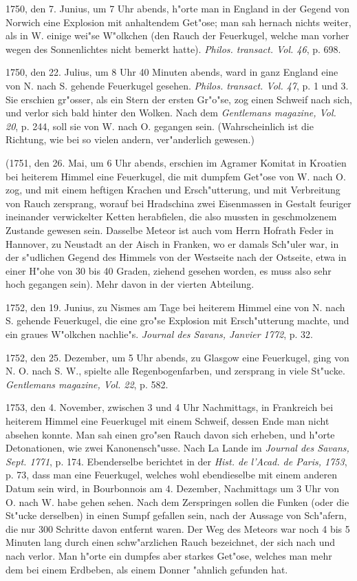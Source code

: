 \documentclass[a4paper, 11pt, oneside, polutonikogreek, german]{article}
\begin{document}
1750, den 7. Junius, um 7 Uhr abends, h"orte man in England in der Gegend von Norwich eine Explosion mit anhaltendem Get"ose; man sah hernach nichts weiter, als in W. einige wei"se W"olkchen (den Rauch der Feuerkugel, welche man vorher wegen des Sonnenlichtes nicht bemerkt hatte). \emph{Philos. transact. Vol. 46}, p. 698.

1750, den 22. Julius, um 8 Uhr 40 Minuten abends, ward in ganz England eine von N. nach S. gehende Feuerkugel gesehen. \emph{Philos. transact. Vol. 47}, p. 1 und 3. Sie erschien gr"osser, als ein Stern der ersten Gr"o"se, zog einen Schweif nach sich, und verlor sich bald hinter den Wolken. Nach dem \emph{Gentlemans magazine, Vol. 20}, p. 244, soll sie von W. nach O. gegangen sein. (Wahrscheinlich ist die Richtung, wie bei so vielen andern, ver"anderlich gewesen.)

(1751, den 26. Mai, um 6 Uhr abends, erschien im Agramer Komitat in Kroatien bei heiterem Himmel eine Feuerkugel, die mit dumpfem Get"ose von W. nach O. zog, und mit einem heftigen Krachen und Ersch"utterung, und mit Verbreitung von Rauch zersprang, worauf bei Hradschina zwei Eisenmassen in Gestalt feuriger ineinander verwickelter Ketten herabfielen, die also mussten in geschmolzenem Zustande gewesen sein. Dasselbe Meteor ist auch vom Herrn Hofrath Feder in Hannover, zu Neustadt an der Aisch in Franken, wo er damals Sch"uler war, in der s"udlichen Gegend des Himmels von der Westseite nach der Ostseite, etwa in einer H"ohe von 30 bis 40 Graden, ziehend gesehen worden, es muss also sehr hoch gegangen sein). Mehr davon in der vierten Abteilung.

1752, den 19. Junius, zu Nismes am Tage bei heiterem Himmel eine von N. nach S. gehende Feuerkugel, die eine gro"se Explosion mit Ersch"utterung machte, und ein graues W"olkchen nachlie"s. \emph{Journal des Savans, Janvier 1772}, p. 32.

1752, den 25. Dezember, um 5 Uhr abends, zu Glasgow eine Feuerkugel, ging von N. O. nach S. W., spielte alle Regenbogenfarben, und zersprang in viele St"ucke. \emph{Gentlemans magazine, Vol. 22}, p. 582.

1753, den 4. November, zwischen 3 und 4 Uhr Nachmittags, in Frankreich bei heiterem Himmel eine Feuerkugel mit einem Schweif, dessen Ende man nicht absehen konnte. Man sah einen gro"sen Rauch davon sich erheben, und h"orte Detonationen, wie zwei Kanonensch"usse. Nach La Lande im \emph{Journal des Savans, Sept. 1771}, p. 174. Ebenderselbe berichtet in der \emph{Hist. de l'Acad. de Paris, 1753}, p. 73, dass man eine Feuerkugel, welches wohl ebendieselbe mit einem anderen Datum sein wird, in Bourbonnois am 4. Dezember, Nachmittags um 3 Uhr von O. nach W. habe gehen sehen. Nach dem Zerspringen sollen die Funken (oder die St"ucke derselben) in einen Sumpf gefallen sein, nach der Aussage von Sch"afern, die nur 300 Schritte davon entfernt waren. Der Weg des Meteors war noch 4 bis 5 Minuten lang durch einen schw"arzlichen Rauch bezeichnet, der sich nach und nach verlor. Man h"orte ein dumpfes aber starkes Get"ose, welches man mehr dem bei einem Erdbeben, als einem Donner "ahnlich gefunden hat.
\end{document}
